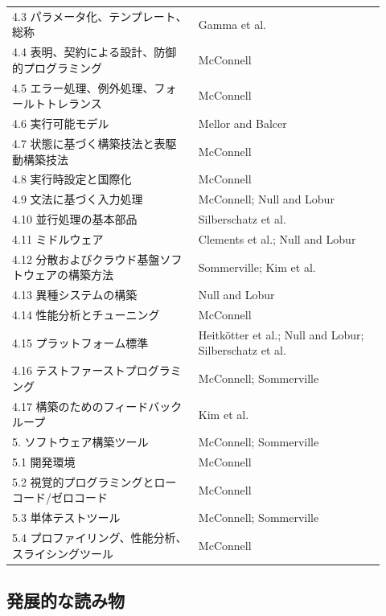 \documentclass[a4paper,11pt]{ltjsarticle}
\numberwithin{figure}{section}
\numberwithin{table}{section}
\begin{document}
\begin{longtable}{L{0.46\linewidth}L{0.46\linewidth}}
4.3 パラメータ化、テンプレート、総称 & Gamma et al. \\
4.4 表明、契約による設計、防御的プログラミング & McConnell \\
4.5 エラー処理、例外処理、フォールトトレランス & McConnell \\
4.6 実行可能モデル & Mellor and Balcer \\
4.7 状態に基づく構築技法と表駆動構築技法 & McConnell \\
4.8 実行時設定と国際化 & McConnell \\
4.9 文法に基づく入力処理 & McConnell; Null and Lobur \\
4.10 並行処理の基本部品 & Silberschatz et al. \\
4.11 ミドルウェア & Clements et al.; Null and Lobur \\
4.12 分散およびクラウド基盤ソフトウェアの構築方法 & Sommerville; Kim et al. \\
4.13 異種システムの構築 & Null and Lobur \\
4.14 性能分析とチューニング & McConnell \\
4.15 プラットフォーム標準 & Heitkötter et al.; Null and Lobur; Silberschatz et al. \\
4.16 テストファーストプログラミング & McConnell; Sommerville \\
4.17 構築のためのフィードバックループ & Kim et al. \\
5. ソフトウェア構築ツール & McConnell; Sommerville \\
5.1 開発環境 & McConnell \\
5.2 視覚的プログラミングとローコード/ゼロコード & McConnell \\
5.3 単体テストツール & McConnell; Sommerville \\
5.4 プロファイリング、性能分析、スライシングツール & McConnell \\
\bottomrule
\end{longtable}

\subsection{発展的な読み物}
\end{document}
